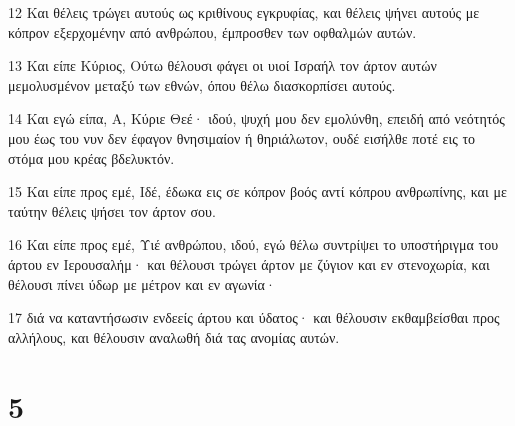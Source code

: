 \par 12 Και θέλεις τρώγει αυτούς ως κριθίνους εγκρυφίας, και θέλεις ψήνει αυτούς με κόπρον εξερχομένην από ανθρώπου, έμπροσθεν των οφθαλμών αυτών.
\par 13 Και είπε Κύριος, Ούτω θέλουσι φάγει οι υιοί Ισραήλ τον άρτον αυτών μεμολυσμένον μεταξύ των εθνών, όπου θέλω διασκορπίσει αυτούς.
\par 14 Και εγώ είπα, Α, Κύριε Θεέ· ιδού, ψυχή μου δεν εμολύνθη, επειδή από νεότητός μου έως του νυν δεν έφαγον θνησιμαίον ή θηριάλωτον, ουδέ εισήλθε ποτέ εις το στόμα μου κρέας βδελυκτόν.
\par 15 Και είπε προς εμέ, Ιδέ, έδωκα εις σε κόπρον βοός αντί κόπρου ανθρωπίνης, και με ταύτην θέλεις ψήσει τον άρτον σου.
\par 16 Και είπε προς εμέ, Υιέ ανθρώπου, ιδού, εγώ θέλω συντρίψει το υποστήριγμα του άρτου εν Ιερουσαλήμ· και θέλουσι τρώγει άρτον με ζύγιον και εν στενοχωρία, και θέλουσι πίνει ύδωρ με μέτρον και εν αγωνία·
\par 17 διά να καταντήσωσιν ενδεείς άρτου και ύδατος· και θέλουσιν εκθαμβείσθαι προς αλλήλους, και θέλουσιν αναλωθή διά τας ανομίας αυτών.

\chapter{5}


